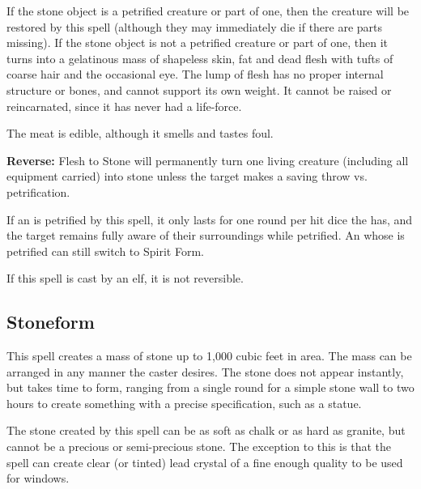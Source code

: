 \begin{multicols*}{2}
If the stone object is a petrified creature or part of one, then the creature will be restored by this spell (although they may immediately die if there are parts missing). If the stone object is not a petrified creature or part of one, then it turns into a gelatinous mass of shapeless skin, fat and dead flesh with tufts of coarse hair and the occasional eye. The lump of flesh has no proper internal structure or bones, and cannot support its own weight. It cannot be raised or reincarnated, since it has never had a life-force.

The meat is edible, although it smells and tastes foul.

\textbf{Reverse:} \hypertarget{spell:Flesh to Stone}{Flesh to Stone} will permanently turn one living creature (including all equipment carried) into stone unless the target makes a saving throw vs. petrification.

If an  is petrified by this spell, it only lasts for one round per hit dice the  has, and the target remains fully aware of their surroundings while petrified. An  whose  is petrified can still switch to Spirit Form.

If this spell is cast by an elf, it is not reversible.

\subsection{Stoneform}\label{spell:Stoneform}

This spell creates a mass of stone up to 1,000 cubic feet in area. The mass can be arranged in any manner the caster desires. The stone does not appear instantly, but takes time to form, ranging from a single round for a simple stone wall to two hours to create something with a precise specification, such as a statue.

The stone created by this spell can be as soft as chalk or as hard as granite, but cannot be a precious or semi-precious stone. The exception to this is that the spell can create clear (or tinted) lead crystal of a fine enough quality to be used for windows.


\end{multicols*}
